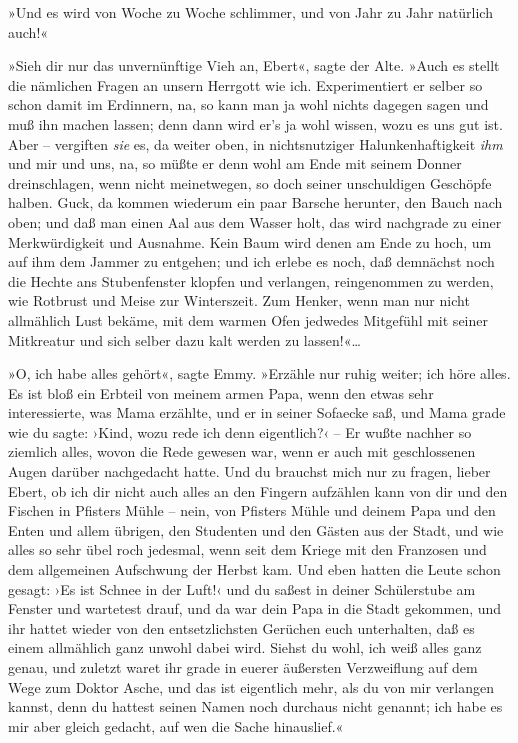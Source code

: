 »Und es wird von Woche zu Woche schlimmer, und von Jahr zu Jahr
natürlich auch!«

»Sieh dir nur das unvernünftige Vieh an, Ebert«, sagte der Alte.
»Auch es stellt die nämlichen Fragen an unsern Herrgott wie ich.
Experimentiert er selber so schon damit im Erdinnern, na, so kann
man ja wohl nichts dagegen sagen und muß ihn machen lassen; denn
dann wird er's ja wohl wissen, wozu es uns gut ist. Aber –
vergiften \emph{sie} es, da weiter oben, in nichtsnutziger
Halunkenhaftigkeit \emph{ihm} und mir und uns, na, so müßte er denn
wohl am Ende mit seinem Donner dreinschlagen, wenn nicht
meinetwegen, so doch seiner unschuldigen Geschöpfe halben. Guck, da
kommen wiederum ein paar Barsche herunter, den Bauch nach oben; und
daß man einen Aal aus dem Wasser holt, das wird nachgrade zu einer
Merkwürdigkeit und Ausnahme. Kein Baum wird denen am Ende zu hoch,
um auf ihm dem Jammer zu entgehen; und ich erlebe es noch, daß
demnächst noch die Hechte ans Stubenfenster klopfen und verlangen,
reingenommen zu werden, wie Rotbrust und Meise zur Winterszeit. Zum
Henker, wenn man nur nicht allmählich Lust bekäme, mit dem warmen
Ofen jedwedes Mitgefühl mit seiner Mitkreatur und sich selber dazu
kalt werden zu lassen!«\ldots{}

»O, ich habe alles gehört«, sagte Emmy. »Erzähle nur ruhig weiter;
ich höre alles. Es ist bloß ein Erbteil von meinem armen Papa, wenn
den etwas sehr interessierte, was Mama erzählte, und er in seiner
Sofaecke saß, und Mama grade wie du sagte: ›Kind, wozu rede ich
denn eigentlich?‹ – Er wußte nachher so ziemlich alles, wovon die
Rede gewesen war, wenn er auch mit geschlossenen Augen darüber
nachgedacht hatte. Und du brauchst mich nur zu fragen, lieber
Ebert, ob ich dir nicht auch alles an den Fingern aufzählen kann
von dir und den Fischen in Pfisters Mühle – nein, von Pfisters
Mühle und deinem Papa und den Enten und allem übrigen, den
Studenten und den Gästen aus der Stadt, und wie alles so sehr übel
roch jedesmal, wenn seit dem Kriege mit den Franzosen und dem
allgemeinen Aufschwung der Herbst kam. Und eben hatten die Leute
schon gesagt: ›Es ist Schnee in der Luft!‹ und du saßest in deiner
Schülerstube am Fenster und wartetest drauf, und da war dein Papa
in die Stadt gekommen, und ihr hattet wieder von den
entsetzlichsten Gerüchen euch unterhalten, daß es einem allmählich
ganz unwohl dabei wird. Siehst du wohl, ich weiß alles ganz genau,
und zuletzt waret ihr grade in euerer äußersten Verzweiflung auf
dem Wege zum Doktor Asche, und das ist eigentlich mehr, als du von
mir verlangen kannst, denn du hattest seinen Namen noch durchaus
nicht genannt; ich habe es mir aber gleich gedacht, auf wen die
Sache hinauslief.«

